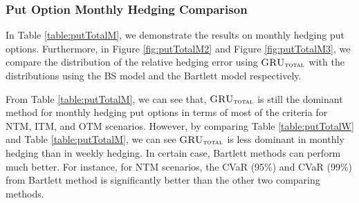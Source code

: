 \documentclass[letterpaper,12pt,titlepage,oneside,final]{book}
\numberwithin{equation}{section}
\theoremstyle{definition}
\newcommand{\modelT}{\textsc{GRU}_{\textsc{total}}}
\begin{document}
\newpage
\subsubsection{Put Option Monthly Hedging Comparison}
In Table \ref{table:putTotalM}, we demonstrate the results on monthly hedging put options. Furthermore, in Figure \ref{fig:putTotalM2} and  Figure \ref{fig:putTotalM3}, we compare the distribution of the relative hedging error using $\modelT$ with the distributions using the BS model and the Bartlett model respectively.

From Table \ref{table:putTotalM}, we can see that, $\modelT$ is still the dominant  method for monthly hedging put options in terms of most of the criteria for NTM, ITM, and OTM scenarios.  However, by comparing Table \ref{table:putTotalW} and Table \ref{table:putTotalM}, we can see $\modelT$ is less dominant in monthly hedging than in weekly hedging. In certain case, Bartlett methods can perform much better. For instance, for NTM scenarios, the CVaR (95\%) and CVaR (99\%) from Bartlett method is significantly better than the other two comparing methods. 
\end{document}
